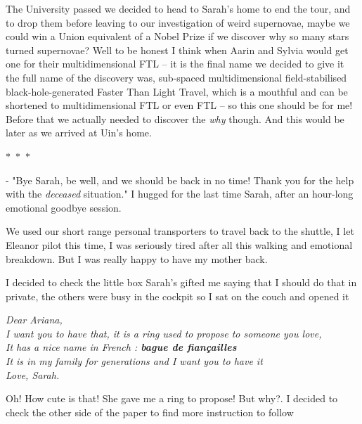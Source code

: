 \documentclass[colorlinks,12pt,a4paper]{book}
\newcommand\sep{\begin{center}
  \boldmath $\ast$~$\ast$~$\ast$
\end{center}}
\begin{document}
 The University passed we decided to head to Sarah's home to end the tour, and to drop them before leaving to our investigation of 
 weird supernovae, maybe we could win a Union equivalent of a Nobel Prize if we discover why so many stars turned supernovae? Well to be honest 
 I think when Aarin and Sylvia would get one for their multidimensional FTL -- it is the final name we decided to give it the full name of the 
 discovery was, sub-spaced multidimensional field-stabilised black-hole-generated Faster Than Light Travel, which is a mouthful 
 and can be shortened to multidimensional FTL or even FTL -- so this one should be for me! Before that we actually needed to discover 
 the \textit{why} though. And this would be later as we arrived at Uin's home.
 
 \sep 
 
 - "Bye Sarah, be well, and we should be back in no time! Thank you for the help with the \textit{deceased} situation." I hugged for the 
 last time Sarah, after an hour-long emotional goodbye session.\par 
 \bigskip 
 
 We used our short range personal transporters to travel back to the shuttle, I let Eleanor pilot this time, I was seriously 
 tired after all this walking and emotional breakdown. But I was really happy to have my mother back.\par 
 \bigskip 
 
 I decided to check the little box Sarah's gifted me saying that I should do that in private, the others were busy in the cockpit so I sat 
 on the couch and opened it\par 
 \bigskip 
 
 \begin{center}
 \textit{
   Dear Ariana,\\
   I want you to have that, it is a ring used to propose to someone you love,\\
   It has a nice name in French : \textbf{bague de fiançailles}\\
   It is in my family for generations and I want you to have it\\
   Love, Sarah.
 }
 \end{center}\par
 \bigskip
 
 Oh! How cute is that! She gave me a ring to propose! But why?. I decided to check the other side of the paper to 
 find more instruction to follow\par 
 \bigskip
 
\end{document}
